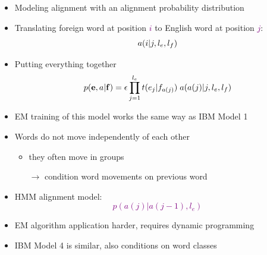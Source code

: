 \documentclass[landscape]{slides}
\newcommand{\maths}[1]{\textcolor{purple}{#1}}
\begin{document}
\begin{itemize}
\item Modeling alignment with an alignment probability distribution
\item Translating foreign word at position \maths{$i$} to English word at position \maths{$j$}:
\maths{\begin{equation*}\vspace{-5mm}
a(i|j,l_e,l_f)
\end{equation*}}\vspace{-5mm}
\item Putting everything together
\maths{\begin{equation*}\vspace{-10mm}
p({\bf e},a|{\bf f}) = 
\epsilon \prod_{j=1}^{l_e} t(e_j|f_{a(j)}) \; a(a(j)|j,l_e,l_f)
\end{equation*}}\vspace{-5mm}
\item EM training of this model works the same way as IBM Model 1
\end{itemize}


\vspace{10mm}
\begin{itemize}
\item Words do not move independently of each other
\begin{itemize}
\item they often move in groups
\item[$\rightarrow$] condition word movements on previous word
\end{itemize} 
\item HMM alignment model:\\
\maths{\begin{equation*}
p(a(j)|a(j-1),l_e)
\end{equation*}}
\item EM algorithm application harder, requires dynamic programming
\item IBM Model 4 is similar, also conditions on word classes
\end{itemize}


\end{document}
